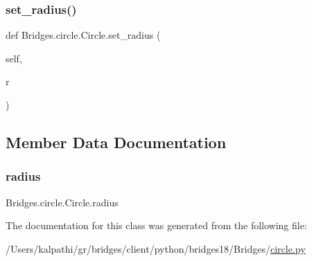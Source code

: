 \subsubsection{\texorpdfstring{set\+\_\+radius()}{set\_radius()}}
{\footnotesize\ttfamily def Bridges.\+circle.\+Circle.\+set\+\_\+radius (\begin{DoxyParamCaption}\item[{}]{self,  }\item[{}]{r }\end{DoxyParamCaption})}



\subsection{Member Data Documentation}
\mbox{\label{class_bridges_1_1circle_1_1_circle_acd92a71e93a265ad2679935b007f279f}} 
\subsubsection{\texorpdfstring{radius}{radius}}
{\footnotesize\ttfamily Bridges.\+circle.\+Circle.\+radius}



The documentation for this class was generated from the following file\+:\begin{DoxyCompactItemize}
\item 
/\+Users/kalpathi/gr/bridges/client/python/bridges18/\+Bridges/\mbox{\hyperlink{circle_8py}{circle.\+py}}\end{DoxyCompactItemize}
